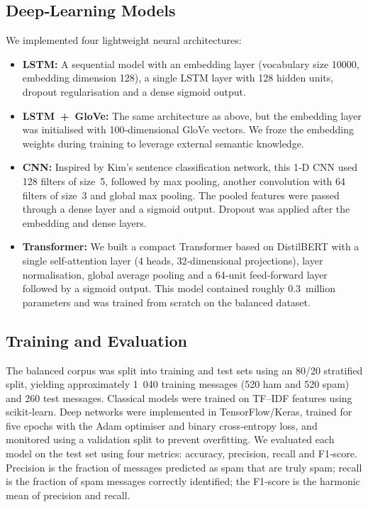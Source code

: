 \documentclass[conference]{IEEEtran}
\begin{document}
\subsection{Deep‑Learning Models}
We implemented four lightweight neural architectures:
\begin{itemize}
  \item \textbf{LSTM:} A sequential model with an embedding layer (vocabulary size 10000, embedding dimension 128), a single LSTM layer with 128 hidden units, dropout regularisation and a dense sigmoid output.
  \item \textbf{LSTM + GloVe:} The same architecture as above, but the embedding layer was initialised with 100‑dimensional GloVe vectors\cite{pennington2014}.  We froze the embedding weights during training to leverage external semantic knowledge.
  \item \textbf{CNN:} Inspired by Kim’s sentence classification network\cite{kim2014}, this 1‑D CNN used 128 filters of size 5, followed by max pooling, another convolution with 64 filters of size 3 and global max pooling.  The pooled features were passed through a dense layer and a sigmoid output.  Dropout was applied after the embedding and dense layers.
  \item \textbf{Transformer:} We built a compact Transformer based on DistilBERT\cite{sanh2019} with a single self‑attention layer (4 heads, 32‑dimensional projections), layer normalisation, global average pooling and a 64‑unit feed‑forward layer followed by a sigmoid output.  This model contained roughly 0.3 million parameters and was trained from scratch on the balanced dataset.
\end{itemize}

\subsection{Training and Evaluation}
The balanced corpus was split into training and test sets using an 80/20 stratified split, yielding approximately 1 040 training messages (520 ham and 520 spam) and 260 test messages.  Classical models were trained on TF–IDF features using scikit‑learn\cite{pedregosa2012}.  Deep networks were implemented in TensorFlow/Keras, trained for five epochs with the Adam optimiser and binary cross‑entropy loss, and monitored using a validation split to prevent overfitting.  We evaluated each model on the test set using four metrics: accuracy, precision, recall and F1‑score.  Precision is the fraction of messages predicted as spam that are truly spam; recall is the fraction of spam messages correctly identified; the F1‑score is the harmonic mean of precision and recall.
\end{document}
